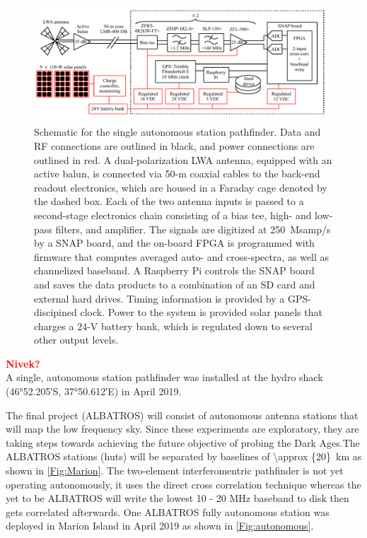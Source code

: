 \documentclass{ws-jai}
\begin{document}
\begin{figure}
  \begin{center}
    \includegraphics[width=\linewidth]{Figures/albatros_single_schematic/albatros_single_schematic.pdf}
    \caption{Schematic for the single autonomous station pathfinder.
      Data and RF connections are outlined in black, and power
      connections are outlined in red.  A dual-polarization LWA
      antenna, equipped with an active balun, is connected via 50-m
      coaxial cables to the back-end readout electronics, which are
      housed in a Faraday cage denoted by the dashed box.  Each of the
      two antenna inputs is passed to a second-stage electronics chain
      consisting of a bias tee, high- and low-pass filters, and
      amplifier.  The signals are digitized at 250~Msamp/s by a SNAP
      board, and the on-board FPGA is programmed with firmware that
      computes averaged auto- and cross-spectra, as well as
      channelized baseband.  A Raspberry Pi controls the SNAP board
      and saves the data products to a combination of an SD card and
      external hard drives.  Timing information is provided by a
      GPS-discipined clock.  Power to the system is provided solar
      panels that charges a 24-V battery bank, which is regulated down
      to several other output levels.}
    \label{Fig:Signal Chain}
  \end{center}
\end{figure}

\textcolor{red}{\bf Nivek?} \\

A single, autonomous station pathfinder was installed at the hydro
shack (\ang{46;52.205;}S, \ang{37;50.612;}E) in April 2019.

The final project (ALBATROS) will consist of autonomous antenna
stations that will map the low frequency sky. Since these experiments
are exploratory, they are taking steps towards achieving the future
objective of probing the Dark Ages.The ALBATROS stations (huts) will
be separated by baselines of \SI{\approx {20}}{km} as shown in
\autoref{Fig:Marion}. The two-element interferomentric pathfinder is
not yet operating autonomously, it uses the direct cross correlation
technique whereas the yet to be ALBATROS will write the lowest 10 - 20
MHz baseband to disk then gets correlated afterwards. One ALBATROS
fully autonomous station was deployed in Marion Island in April 2019
as shown in \autoref{Fig:autonomous}.
\end{document}
